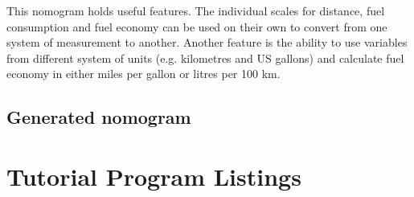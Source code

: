 \documentclass[a4paper,11pt,english]{sphinxmanual}
\begin{document}
This nomogram holds useful features.  The individual scales for distance, fuel consumption and fuel economy can be used on their own to convert from one system of measurement to another.  Another feature is the ability to use variables from different system of units (e.g. kilometres and US gallons) and calculate fuel economy in either miles per gallon or litres per 100 km.


\subsection{Generated nomogram}
\label{\detokenize{tutorials/tutorials:id4}}
\noindent{}


\section{Tutorial Program Listings}
\label{\detokenize{tutorials/tutorials:tutorial-program-listings}}
\end{document}
